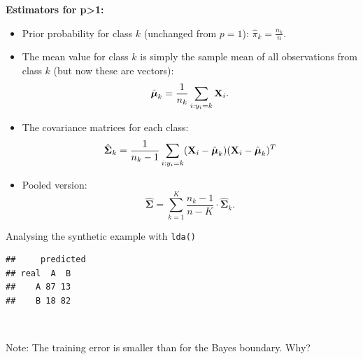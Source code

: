 \documentclass[
  10pt,
  ignorenonframetext,
]{beamer}
\newenvironment{Shaded}{\begin{snugshade}}{\end{snugshade}}
\newcommand{\AttributeTok}[1]{\textcolor[rgb]{0.13,0.29,0.53}{#1}}
\newcommand{\FunctionTok}[1]{\textcolor[rgb]{0.13,0.29,0.53}{\textbf{#1}}}
\newcommand{\NormalTok}[1]{#1}
\newcommand{\OtherTok}[1]{\textcolor[rgb]{0.56,0.35,0.01}{#1}}
\newcommand{\SpecialCharTok}[1]{\textcolor[rgb]{0.81,0.36,0.00}{\textbf{#1}}}
\begin{document}
\begin{frame}
\textbf{Estimators for p\textgreater1:}

\begin{itemize}
\item
  Prior probability for class \(k\) (unchanged from \(p=1\)):
  \(\hat{\pi}_k = \frac{n_k}{n}.\)
\item
  The mean value for class \(k\) is simply the sample mean of all
  observations from class \(k\) (but now these are vectors):
  \[\hat{\boldsymbol{\mu}}_k = \frac{1}{n_k}\sum_{i:y_i=k} {\bf X}_i.\]
\item
  The covariance matrices for each class:
  \[\hat{\boldsymbol{\Sigma}}_k=\frac{1}{n_k-1}\sum_{i:y_i=k} ({\bf X}_i-\hat{\boldsymbol{\mu}}_k ) ({\bf X}_i-\hat{\boldsymbol{\mu}}_k)^T\]
\item
  Pooled version:
  \[\hat{\boldsymbol{\Sigma}}= \sum_{k=1}^K \frac{n_k - 1}{n - K} \cdot \hat{\boldsymbol{\Sigma}}_k.\]
\end{itemize}
\end{frame}

\begin{frame}[fragile]
\begin{block}{Analysing the synthetic example with \texttt{lda()}}
\protect\hypertarget{analysing-the-synthetic-example-with-lda}{}
\(~\)

\scriptsize

\begin{Shaded}
\end{Shaded}

\begin{verbatim}
##     predicted
## real  A  B
##    A 87 13
##    B 18 82
\end{verbatim}

\(~\)

\normalsize

Note: The training error is smaller than for the Bayes boundary. Why?
\end{block}
\end{frame}
\end{document}
